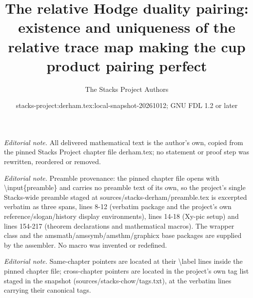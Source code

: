 \documentclass[10pt,a4paper]{amsart}
\title{The relative Hodge duality pairing: existence and uniqueness of the relative trace map making the cup product pairing perfect}
\author{The Stacks Project Authors}
\date{stacks-project:derham.tex:local-snapshot-20261012; GNU FDL 1.2 or later}
\theoremstyle{plain}
\theoremstyle{definition}
\theoremstyle{remark}
\numberwithin{equation}{subsection}
\begin{document}
\maketitle
\noindent\textit{Editorial note.} All delivered mathematical text is the author's own, copied from the pinned Stacks Project chapter file derham.tex; no statement or proof step was rewritten, reordered or removed.\par\medskip
\noindent\textit{Editorial note.} Preamble provenance: the pinned chapter file opens with \textbackslash{}input\{preamble\} and carries no preamble text of its own, so the project's single Stacks-wide preamble staged at sources/stacks-derham/preamble.tex is excerpted verbatim as three spans, lines 8-12 (verbatim package and the project's own reference/slogan/history display environments), lines 14-18 (Xy-pic setup) and lines 154-217 (theorem declarations and mathematical macros). The wrapper class and the amsmath/amssymb/amsthm/graphicx base packages are supplied by the assembler. No macro was invented or redefined.\par\medskip
\noindent\textit{Editorial note.} Same-chapter pointers are located at their \textbackslash{}label lines inside the pinned chapter file; cross-chapter pointers are located in the project's own tag list staged in the snapshot (sources/stacks-chow/tags.txt), at the verbatim lines carrying their canonical tags.\par\medskip
\end{document}
